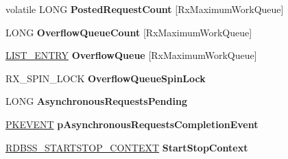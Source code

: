 \begin{DoxyCompactItemize}
\begin{tabbing}
\end{tabbing}\item 
\mbox{\label{struct___r_d_b_s_s___d_e_v_i_c_e___o_b_j_e_c_t_a9adff30c39cc727f006018bd3926e73d}} 
volatile L\+O\+NG {\bfseries Posted\+Request\+Count} \mbox{[}Rx\+Maximum\+Work\+Queue\mbox{]}
\item 
\mbox{\label{struct___r_d_b_s_s___d_e_v_i_c_e___o_b_j_e_c_t_a06242a847c0ccbf42b07166bd7e408a7}} 
L\+O\+NG {\bfseries Overflow\+Queue\+Count} \mbox{[}Rx\+Maximum\+Work\+Queue\mbox{]}
\item 
\mbox{\label{struct___r_d_b_s_s___d_e_v_i_c_e___o_b_j_e_c_t_a27d9810250df68df8ada9f1b491b7f15}} 
\hyperlink{struct___l_i_s_t___e_n_t_r_y}{L\+I\+S\+T\+\_\+\+E\+N\+T\+RY} {\bfseries Overflow\+Queue} \mbox{[}Rx\+Maximum\+Work\+Queue\mbox{]}
\item 
\mbox{\label{struct___r_d_b_s_s___d_e_v_i_c_e___o_b_j_e_c_t_a99eea3420a6f8efcd19125e70ea336b2}} 
R\+X\+\_\+\+S\+P\+I\+N\+\_\+\+L\+O\+CK {\bfseries Overflow\+Queue\+Spin\+Lock}
\item 
\mbox{\label{struct___r_d_b_s_s___d_e_v_i_c_e___o_b_j_e_c_t_ada0884dcac30f06be25b83264a575570}} 
L\+O\+NG {\bfseries Asynchronous\+Requests\+Pending}
\item 
\mbox{\label{struct___r_d_b_s_s___d_e_v_i_c_e___o_b_j_e_c_t_ab04278d8c3d704f032d81b89ade30304}} 
\hyperlink{struct___k_e_v_e_n_t}{P\+K\+E\+V\+E\+NT} {\bfseries p\+Asynchronous\+Requests\+Completion\+Event}
\item 
\mbox{\label{struct___r_d_b_s_s___d_e_v_i_c_e___o_b_j_e_c_t_a1b376879d42a4d710fd5c18eb6c81d33}} 
\hyperlink{struct___r_d_b_s_s___s_t_a_r_t_s_t_o_p___c_o_n_t_e_x_t__}{R\+D\+B\+S\+S\+\_\+\+S\+T\+A\+R\+T\+S\+T\+O\+P\+\_\+\+C\+O\+N\+T\+E\+XT} {\bfseries Start\+Stop\+Context}
\item 
\mbox{\label{struct___r_d_b_s_s___d_e_v_i_c_e___o_b_j_e_c_t_a886cf107250cd78096fb0752a5c641ea}} 

\end{DoxyCompactItemize}
